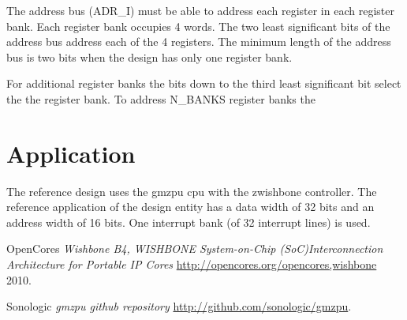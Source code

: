 \documentclass[a4paper,twocolumn,12pt]{article}
\begin{document}
The address bus (ADR\_I) must be able to address each register in each register bank. Each register bank occupies 4 words. The two least significant bits of the address bus address each of the 4 registers. The minimum length of the address bus is two bits when the design has only one register bank.

For additional register banks the bits down to the third least significant bit select the the register bank. To address N\_BANKS register banks the 

\section{Application}

The reference design uses the gmzpu \cite{gmzpu} cpu with the zwishbone controller. The reference application of the design entity has a data width of 32 bits and an address width of 16 bits. One interrupt bank (of 32 interrupt lines) is used.

\begin{thebibliography}{9}

 OpenCores \emph{Wishbone B4, WISHBONE System-on-Chip (SoC)Interconnection Architecture for Portable IP Cores} \url{http://opencores.org/opencores,wishbone} 2010.

 Sonologic \emph{gmzpu github repository} \url{http://github.com/sonologic/gmzpu}.
\end{thebibliography}
\end{document}
